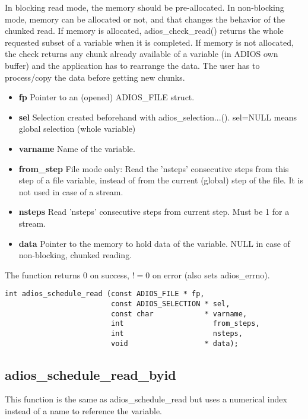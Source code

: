 In blocking read mode, the memory should be pre-allocated. 
In non-blocking mode, memory can be allocated or not, and that changes the behavior of the chunked read. 
If memory is allocated, adios\_check\_read() returns the whole requested subset of a variable when it is completed.
If memory is not allocated, the check returns any chunk already available of a variable (in ADIOS own buffer)
and the application has to rearrange the data. The user has to process/copy the data before getting new chunks.

\begin{itemize}
\item{\bf  fp}         Pointer to an (opened) ADIOS\_FILE struct.
\item{\bf  sel}        Selection created beforehand with adios\_selection...().
                 sel=NULL means global selection (whole variable)
\item{\bf  varname}    Name of the variable.
\item{\bf  from\_step}  File mode only: Read the 'nsteps' consecutive steps from this 
step of a file variable, instead of from the current (global) step of the file. It is not used in case of a stream.
\item{\bf nsteps}     Read 'nsteps' consecutive steps from current step. Must be 1 for a stream. 
\item{\bf data} Pointer to the memory to hold data of the variable. NULL in case of non-blocking, chunked reading.
\end{itemize}

The function returns 0 on success, $!=0$ on error (also sets adios\_errno).

\begin{lstlisting}[alsolanguage=C]
int adios_schedule_read (const ADIOS_FILE * fp,
                         const ADIOS_SELECTION * sel,
                         const char            * varname,
                         int                     from_steps,
                         int                     nsteps,
                         void                  * data);
\end{lstlisting}



\subsection{adios\_schedule\_read\_byid}
This function is the same as adios\_schedule\_read but uses a numerical index instead of a name to reference the variable. 

